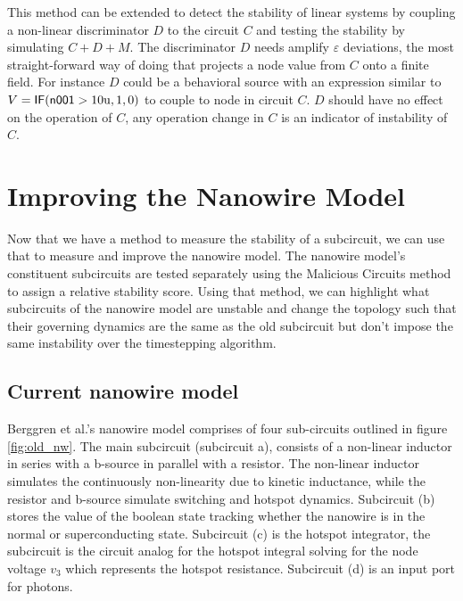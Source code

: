 This method can be extended to detect the stability of linear systems by coupling
a non-linear discriminator $D$ to the circuit $C$ and testing the stability by simulating
$C+D+M$. The discriminator $D$ needs amplify $\varepsilon$ deviations, the most straight-forward
way of doing that projects a node value from $C$ onto a finite field. For instance $D$ 
could be a behavioral source with an expression similar to $V=\textnormal{\textsf{IF}}(\textnormal{\textsf{n001}}>10\mathrm{u}, 1, 0)$ 
to couple to node  in circuit $C$. $D$ should have no effect on the operation of $C$,
any operation change in $C$ is an indicator of instability of $C$.



\section{Improving the Nanowire Model}

Now that we have a method to measure the stability of a subcircuit, we can use that
to measure and improve the nanowire model. The nanowire model's constituent subcircuits are
tested separately using the Malicious Circuits method to assign a relative stability
score. Using that method, we can highlight what subcircuits of the nanowire model are unstable 
and change the topology such that their governing dynamics are the same as the old subcircuit
but don't impose the same instability over the timestepping algorithm.

\subsection{Current nanowire model}
\label{current_nw}

Berggren et al.'s nanowire model comprises of four sub-circuits outlined in figure \ref{fig:old_nw}. The main subcircuit (subcircuit a), consists of a
non-linear inductor in series with a b-source in parallel with a resistor.
The non-linear inductor simulates the continuously non-linearity due to kinetic inductance,
while the resistor and b-source simulate switching and hotspot dynamics.
Subcircuit (b) stores the value of the boolean state tracking 
whether the nanowire is in the normal or superconducting state.
Subcircuit (c) is the hotspot integrator, the subcircuit is the
circuit analog for the hotspot integral solving for the node voltage $v_3$
which represents the hotspot resistance. Subcircuit (d) is an input port for
photons.

